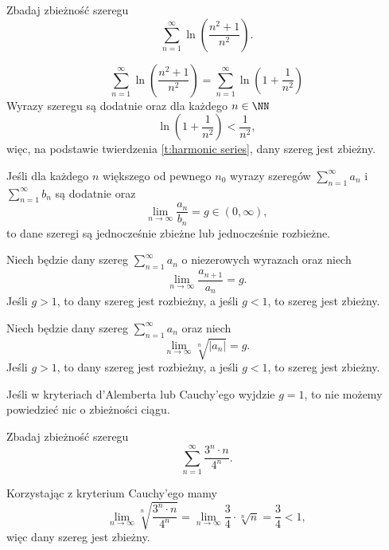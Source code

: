\begin{example}
    Zbadaj zbieżność szeregu
    \[ \sum_{n=1}^\infty \ln\left(\frac{n^2 + 1}{n^2}\right). \]
\end{example}
\begin{solution}
    \[ \sum_{n=1}^\infty \ln\left(\frac{n^2 + 1}{n^2}\right) = \sum_{n=1}^\infty \ln\left(1 + \frac{1}{n^2}\right) \]
    Wyrazy szeregu są dodatnie oraz dla każdego $n \in \NN$
    \[ \ln\left(1 + \frac{1}{n^2}\right)  < \frac{1}{n^2}, \]
    więc, na podstawie twierdzenia \ref{t:harmonic series}, dany szereg jest zbieżny.
\end{solution}

\begin{theorem}
    Jeśli dla każdego $n$ większego od pewnego $n_0$ wyrazy szeregów $\sum_{n=1}^\infty a_n$ i $\sum_{n=1}^\infty b_n$ są dodatnie oraz
    \[ \lim_{n\to\infty} \frac{a_n}{b_n} = g \in (0, \infty), \]
    to dane szeregi są jednocześnie zbieżne lub jednocześnie rozbieżne.
\end{theorem}

\begin{theorem}
    Niech będzie dany szereg $\sum_{n=1}^\infty a_n$ o niezerowych wyrazach oraz niech
    \[ \lim_{n\to\infty} \frac{a_{n+1}}{a_n} = g. \]
    Jeśli $g > 1$, to dany szereg jest rozbieżny, a jeśli $g < 1$, to szereg jest zbieżny.
\end{theorem}

\begin{theorem}
    Niech będzie dany szereg $\sum_{n=1}^\infty a_n$ oraz niech
    \[ \lim_{n\to\infty} \sqrt[n]{|a_n|} = g. \]
    Jeśli $g > 1$, to dany szereg jest rozbieżny, a jeśli $g < 1$, to szereg jest zbieżny.
\end{theorem}

\begin{remark*}
    Jeśli w kryteriach d'Alemberta lub Cauchy'ego wyjdzie $g = 1$, to nie możemy powiedzieć nic o zbieżności ciągu.
\end{remark*}

\begin{example}
    Zbadaj zbieżność szeregu
    \[ \sum_{n=1}^\infty \frac{3^n \cdot n}{4^n}. \]
\end{example}
\begin{solution}
    Korzystając z kryterium Cauchy'ego mamy
    \[ \lim_{n\to\infty} \sqrt[n]{\frac{3^n \cdot n}{4^n}} = \lim_{n\to\infty} \frac{3}{4} \cdot \sqrt[n]{n} = \frac{3}{4} < 1, \]
    więc dany szereg jest zbieżny.
\end{solution}

